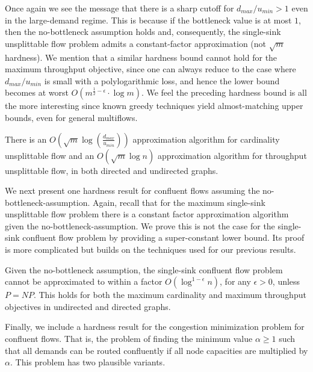 \documentclass[12pt]{article}
\begin{document}
Once again we see the message that there is a sharp cutoff for  $d_{max}/u_{min} > 1$ even in the
large-demand regime. This is because
 if the bottleneck value is at most $1$, then the
no-bottleneck assumption holds and, consequently, the single-sink unsplittable flow problem
admits a constant-factor approximation (not $\sqrt{m}$ hardness).
We mention that a similar hardness bound cannot hold   for the maximum throughput objective, since one can
always reduce to the case where $d_{max}/u_{min}$ is small with a polylogarithmic loss, and hence the lower
bound becomes at worst $O(m^{\frac12-\epsilon}\cdot \log m)$. We feel the preceding hardness bound is all the more
interesting since known greedy techniques
yield almost-matching  upper bounds, even for general multiflows.
\begin{thm}
\label{thm:upper}
There is an $O(\sqrt{m}\log (\frac{d_{max}}{u_{min}}))$ approximation algorithm
for cardinality unsplittable flow and an $O(\sqrt{m}\log n)$ approximation algorithm
for throughput unsplittable flow, in both directed and undirected graphs.
\end{thm}


We next present one hardness result for confluent flows assuming the no-bottleneck-assumption.
Again, recall that for the maximum single-sink unsplittable flow problem
there is a constant factor approximation algorithm given the no-bottleneck-assumption.
We prove this is not the case for the single-sink confluent flow problem by providing a super-constant lower bound.
Its proof is more complicated but builds on the techniques used for our previous results.
\begin{thm}\label{thm:hardnba}
Given the no-bottleneck assumption, the single-sink confluent flow problem
cannot be approximated to within a factor $O(\log^{1-\epsilon}n)$, for any $\epsilon > 0$, unless $P=NP$.
This holds for both the maximum cardinality and maximum throughput objectives
in undirected and directed graphs.
\end{thm}




Finally, we include a hardness result for the congestion minimization problem for confluent flows.
That is, the problem of finding the minimum value $\alpha \geq 1$ such that all demands can be routed confluently if all node capacities are multiplied by $\alpha$.
This problem has two plausible variants.
\end{document}
